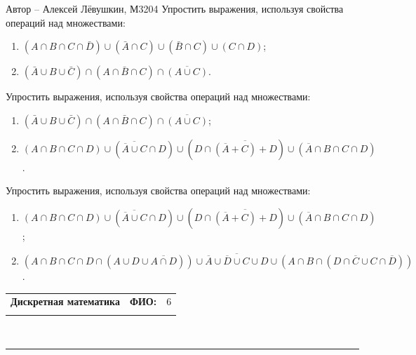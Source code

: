 \documentclass[10pt]{exam}
\newcommand{\class}{Дискретная математика}
\newcommand{\examdate}{}
\begin{document}
\begin{questions}
Автор -- Алексей Лёвушкин, М3204\question
Упростить выражения, используя свойства операций над множествами:

\begin{enumerate}
	\renewcommand{\labelenumi}{\alph{enumi})}
	\item $(A \cap B \cap C \cap \bar{D}) \cup(\bar{A} \cap C) \cup(\bar{B} \cap C) \cup(C \cap D)$;
	\item $(\bar{A} \cup B \cup \bar{C}) \cap(A \cap \bar{B} \cap C) \cap \overline{(A \cup C)}$.
\end{enumerate}
\question
Упростить выражения, используя свойства операций над множествами:

\begin{enumerate}
	\renewcommand{\labelenumi}{\alph{enumi})}
	\item $(\bar{A} \cup B \cup \bar{C}) \cap(A \cap \bar{B} \cap C) \cap \overline{(A \cup C)}$;
	\item $(A\cap B \cap C \cap D) \cup (\overline{\overline{A}\cup C}\cap D) \cup (D\cap\overline{(\overline{A}+C)+D})\cup (\overline{A}\cap B\cap C \cap D)$.
\end{enumerate}
\question
Упростить выражения, используя свойства операций над множествами:

\begin{enumerate}
	\renewcommand{\labelenumi}{\alph{enumi})}
	\item $(A\cap B \cap C \cap D) \cup (\overline{\overline{A}\cup C}\cap D) \cup (D\cap\overline{(\overline{A}+C)+D})\cup (\overline{A}\cap B\cap C \cap D)$;
	\item $(A\cap B \cap C \cap D \cap (A\cup D \cup \overline{A\cap D}))\cup \overline{\overline{A}\cup \overline{D}\cup C\cup D}\cup (A\cap B \cap (D\cap\overline{C}\cup C\cap\overline{D}))$.
\end{enumerate}


\end{questions}
\newpage
\begin{flushright}
\begin{tabular}{p{2.8in} r l}
\textbf{\class} & \textbf{ФИО:} &6\\

\textbf{\examdate} &&\\
\end{tabular}\\
\end{flushright}
\rule[1ex]{\textwidth}{.1pt}
\end{document}
